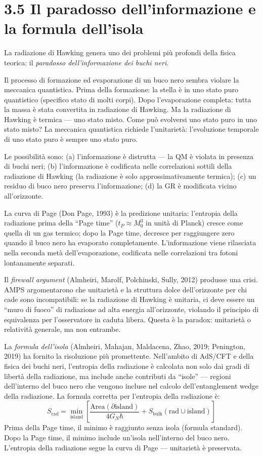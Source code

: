 \documentclass[11.5pt,a4paper,openany]{book}
\theoremstyle{remark}
\begin{document}
\section{3.5 Il paradosso dell'informazione e la formula dell'isola}

La radiazione di Hawking genera uno dei problemi più profondi della fisica teorica: il \textit{paradosso dell'informazione dei buchi neri}.

Il processo di formazione ed evaporazione di un buco nero sembra violare la meccanica quantistica. Prima della formazione: la stella è in uno stato puro quantistico (specifico stato di molti corpi). Dopo l'evaporazione completa: tutta la massa è stata convertita in radiazione di Hawking. Ma la radiazione di Hawking è termica --- uno stato misto. Come può evolversi uno stato puro in uno stato misto? La meccanica quantistica richiede l'unitarietà: l'evoluzione temporale di uno stato puro è sempre uno stato puro.

Le possibilità sono: (a) l'informazione è distrutta --- la QM è violata in presenza di buchi neri; (b) l'informazione è codificata nelle correlazioni sottili della radiazione di Hawking (la radiazione è solo approssimativamente termica); (c) un residuo di buco nero preserva l'informazione; (d) la GR è modificata vicino all'orizzonte.

La curva di Page (Don Page, 1993) è la predizione unitaria: l'entropia della radiazione prima della ``Page time'' ($t_P \approx M_0^3$ in unità di Planck) cresce come quella di un gas termico; dopo la Page time, decresce per raggiungere zero quando il buco nero ha evaporato completamente. L'informazione viene rilasciata nella seconda metà dell'evaporazione, codificata nelle correlazioni tra fotoni lontanamente separati.

Il \textit{firewall argument} (Almheiri, Marolf, Polchinski, Sully, 2012) produsse una crisi. AMPS argomentarono che unitarietà e la struttura dolce dell'orizzonte per chi cade sono incompatibili: se la radiazione di Hawking è unitaria, ci deve essere un ``muro di fuoco'' di radiazione ad alta energia all'orizzonte, violando il principio di equivalenza per l'osservatore in caduta libera. Questa è la paradox: unitarietà o relatività generale, ma non entrambe.

La \textit{formula dell'isola} (Almheiri, Mahajan, Maldacena, Zhao, 2019; Penington, 2019) ha fornito la risoluzione più promettente. Nell'ambito di AdS/CFT e della fisica dei buchi neri, l'entropia della radiazione è calcolata non solo dai gradi di libertà della radiazione, ma include anche contributi da ``isole'' --- regioni dell'interno del buco nero che vengono incluse nel calcolo dell'entanglement wedge della radiazione. La formula corretta per l'entropia della radiazione è:
\[
S_{\text{rad}} = \min_{\text{island}} \left[\frac{\text{Area}(\partial\text{island})}{4G_N\hbar} + S_{\text{bulk}}(\text{rad} \cup \text{island})\right]
\]
Prima della Page time, il minimo è raggiunto senza isola (formula standard). Dopo la Page time, il minimo include un'isola nell'interno del buco nero. L'entropia della radiazione segue la curva di Page --- unitarietà è preservata.
\end{document}

